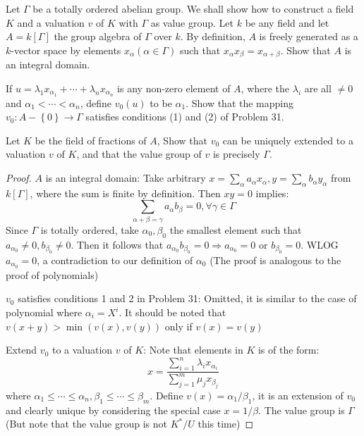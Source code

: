 \documentclass{solution}
\begin{document}
\begin{problem}
    Let $\Gamma$ be a totally ordered abelian group. We shall show how to construct a field $K$ and a valuation $v$ of $K$ with $\Gamma$ as value group. Let $k$ be any field and let $A = k[\Gamma]$ the group algebra of $\Gamma$ over $k$. By definition, $A$ is freely generated as a $k$-vector space by elements $x_{\alpha}(\alpha \in \Gamma)$ such that $x_{\alpha} x_{\beta} = x_{\alpha + \beta}$. Show that $A$ is an integral domain.

    If $u = \lambda_1 x_{\alpha_1} + \cdots + \lambda_n x_{\alpha_n}$ is any non-zero element of $A$, where the $\lambda_i$ are all $\ne 0$ and $\alpha_1 \lt \cdots \lt \alpha_n$, define $v_0(u)$ to be $\alpha_1$. Show that the mapping $v_0: A - \left\lbrace 0 \right\rbrace \rightarrow \Gamma$ satisfies conditions (1) and (2) of Problem 31.

    Let $K$ be the field of fractions of $A$, Show that $v_0$ can be uniquely extended to a valuation $v$ of $K$, and that the value group of $v$ is precisely $\Gamma$.
\end{problem}

\begin{proof}
    $A$ is an integral domain: Take arbitrary $x = \sum\limits_{\alpha} a_\alpha x_\alpha, y = \sum\limits_{\alpha} b_{\alpha} y_\alpha$ from $k[\Gamma]$, where the sum is finite by definition. Then $xy = 0$ implies:
    $$\sum\limits_{\alpha + \beta = \gamma} a_{\alpha} b_{\beta} = 0, \forall \gamma \in \Gamma$$
    Since $\Gamma$ is totally ordered, take $\alpha_0, \beta_0$ the smallest element such that $a_{\alpha_0} \ne 0, b_{\beta_0} \ne 0$. Then it follows that $a_{\alpha_0} b_{\beta_0} = 0 \Rightarrow a_{\alpha_0} = 0$ or $b_{\beta_0} = 0$. WLOG $a_{\alpha_0} = 0$, a contradiction to our definition of $\alpha_0$ ({\color{red}The proof is analogous to the proof of polynomials})

    $v_0$ satisfies conditions 1 and 2 in Problem 31: Omitted, it is similar to the case of polynomial where $\alpha_i = X^i$. It should be noted that $v(x + y) \gt \min(v(x), v(y))$ only if $v(x) = v(y)$

    Extend $v_0$ to a valuation $v$ of $K$: Note that elements in $K$ is of the form:
    $$x = \frac{\sum\limits_{i = 1}^{n} \lambda_i x_{\alpha_i}}{\sum\limits_{j = 1}^{m} \mu_j x_{\beta_j}}$$
    where $\alpha_1 \le \cdots \le \alpha_n, \beta_1 \le \cdots \le \beta_m$. Define $v(x) = \alpha_1 / \beta_1$, it is an extension of $v_0$ and clearly unique by considering the special case $x = 1 / \beta$. The value group is $\Gamma$ (But note that the value group is not $K^* / U$ this time)
\end{proof}
\end{document}

